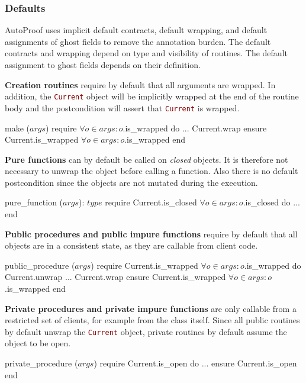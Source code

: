 \documentclass[a4paper,12pt]{article}
\newcommand{\AutoProof}{Auto\-Proof\xspace}
\newcommand{\e}[1]{\mbox{\lstinline[language=Eiffel]|#1|}}
\begin{document}
\subsubsection*{Defaults}

\AutoProof uses implicit default contracts, default wrapping, and default assignments of ghost fields to remove the annotation burden. The default contracts and wrapping depend on type and visibility of routines. The default assignment to ghost fields depends on their definition.

\textbf{Creation routines} require by default that all arguments are wrapped. In addition, the \e{Current} object will be implicitly wrapped at the end of the routine body and the postcondition will assert that \e{Current} is wrapped.
\begin{erunning}
make ($args$)
	require
		$\forall o\in args : o$.is_wrapped
	do
		...
		Current.wrap
	ensure
		Current.is_wrapped
		$\forall o\in args : o$.is_wrapped
	end
\end{erunning}

\textbf{Pure functions} can by default be called on \emph{closed} objects. It is therefore not necessary to unwrap the object before calling a function. Also there is no default postcondition since the objects are not mutated during the execution.
\begin{erunning}
pure_function ($args$): $type$
	require
		Current.is_closed
		$\forall o\in args : o$.is_closed
	do ...	end
\end{erunning}

\textbf{Public procedures and public impure functions} require by default that all objects are in a consistent state, as they are callable from client code.
\begin{erunning}
public_procedure ($args$)
	require
		Current.is_wrapped
		$\forall o\in args : o$.is_wrapped
	do
		Current.unwrap
		...
		Current.wrap
	ensure
		Current.is_wrapped
		$\forall o\in args : o$.is_wrapped
	end
\end{erunning}

\textbf{Private procedures and private impure functions} are only callable from a restricted set of clients, for example from the class itself. Since all public routines by default unwrap the \e{Current} object, private routines by default assume the object to be open.
\begin{erunning}
private_procedure ($args$)
	require
		Current.is_open
	do ...
	ensure
		Current.is_open
	end
\end{erunning}
\end{document}
